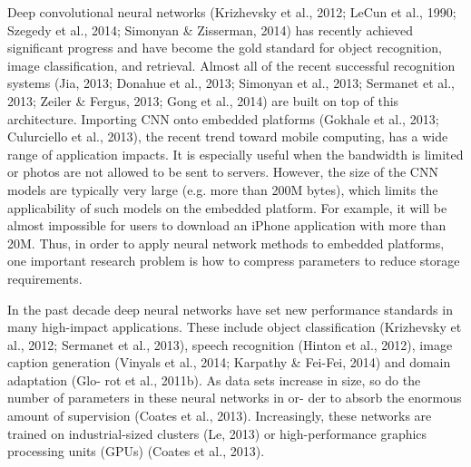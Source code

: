 {Deep convolutional neural networks (Krizhevsky et al., 2012; LeCun et al., 1990; Szegedy et al., 2014; Simonyan \& Zisserman, 2014) has recently achieved significant progress and have become the gold standard for object recognition, image classification, and retrieval. Almost all of the recent successful recognition systems (Jia, 2013; Donahue et al., 2013; Simonyan et al., 2013; Sermanet et al., 2013; Zeiler \& Fergus, 2013; Gong et al., 2014) are built on top of this architecture. Importing CNN onto embedded platforms (Gokhale et al., 2013; Culurciello et al., 2013), the recent trend toward mobile computing, has a wide range of application impacts. It is especially useful when the bandwidth is limited or photos are not allowed to be sent to servers. However, the size of the CNN models are typically very large (e.g. more than 200M bytes), which limits the applicability of such models on the embedded platform. For example, it will be almost impossible for users to download an iPhone application with more than 20M. Thus, in order to apply neural network methods to embedded platforms, one important research problem is how to compress parameters to reduce storage requirements.

In the past decade deep neural networks have set new performance standards in many high-impact applications. These include object classification (Krizhevsky et al., 2012; Sermanet et al., 2013), speech recognition (Hinton et al., 2012), image caption generation (Vinyals et al., 2014; Karpathy \& Fei-Fei, 2014) and domain adaptation (Glo- rot et al., 2011b). As data sets increase in size, so do the number of parameters in these neural networks in or- der to absorb the enormous amount of supervision (Coates et al., 2013). Increasingly, these networks are trained on industrial-sized clusters (Le, 2013) or high-performance graphics processing units (GPUs) (Coates et al., 2013).
}

